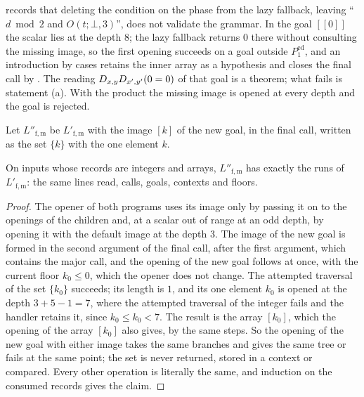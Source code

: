 \begin{remark}\label{cert:rem:lazy-phase}
 records that deleting the condition on the phase from the
lazy fallback, leaving ``$d\bmod 2$ and $O(t;\bot,3)$'', does not validate the
grammar. In the goal $[[0]]$ the scalar lies at the depth $8$; the lazy fallback
returns $0$ there without consulting the missing image, so the first opening
succeeds on a goal outside $P^{\mathrm{ed}}_{1}$, and an introduction by cases
retains the inner array as a hypothesis and closes the final call by
. The reading $D_{x,y}D_{x',y'}(0=0)$ of that goal is a theorem;
what fails is statement (a). With the product the missing image is opened at every
depth and the goal is rejected.
\end{remark}

Let $L''_{\mathrm{f,m}}$ be $L'_{\mathrm{f,m}}$ with the image $[k]$ of the new goal,
in the final call, written as the set $\{k\}$ with the one element $k$.

\begin{proposition}\label{cert:prop:singleton-image}
On inputs whose records are integers and arrays, $L''_{\mathrm{f,m}}$ has exactly
the runs of $L'_{\mathrm{f,m}}$: the same lines read, calls, goals, contexts and
floors.
\end{proposition}
\begin{proof}
The opener of both programs uses its image only by passing it on to the openings
of the children and, at a scalar out of range at an odd depth, by opening it with
the default image at the depth $3$. The image of the new goal is formed in the
second argument of the final call, after the first argument, which contains the
major call, and the opening of the new goal follows at once, with the current floor
$k_0\le 0$, which the opener does not change. The attempted traversal of the set
$\{k_0\}$ succeeds; its length is $1$, and its one element $k_0$ is opened at the
depth $3+5-1=7$, where the attempted traversal of the integer fails and the handler
retains it, since $k_0\le k_0<7$. The result is the array $[k_0]$, which the opening
of the array $[k_0]$ also gives, by the same steps. So the opening of the new goal
with either image takes the same branches and gives the same tree or fails at the
same point; the set is never returned, stored in a context or compared. Every other
operation is literally the same, and induction on the consumed records gives the
claim.
\end{proof}


